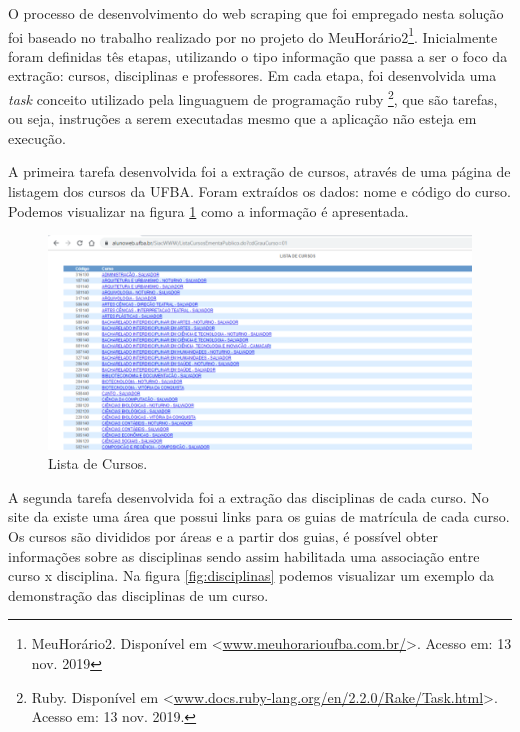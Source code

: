 \documentclass[12pt, a4paper]{report}
\begin{document}
O processo de desenvolvimento do web scraping que foi empregado nesta solução foi baseado no trabalho realizado por \citeauthor{assis2017meuhorario} no projeto do MeuHorário2\footnote{MeuHorário2. Disponível em <\url{www.meuhorarioufba.com.br/}>. Acesso em: 13 nov. 2019}. Inicialmente foram definidas tês etapas, utilizando o tipo informação que passa a ser o foco da extração: cursos, disciplinas e professores.  Em cada etapa, foi desenvolvida uma \textit{task} conceito utilizado pela linguaguem de programação ruby \footnote{Ruby. Disponível em <\url{www.docs.ruby-lang.org/en/2.2.0/Rake/Task.html}>. Acesso em: 13 nov. 2019.}, que são tarefas, ou seja, instruções a serem executadas mesmo que a aplicação não esteja em execução. 

A primeira tarefa desenvolvida foi a extração de cursos, através de uma página de listagem dos cursos da UFBA. Foram extraídos os dados: nome e código do curso. Podemos visualizar na figura \ref{fig:lista_cursos} como a informação é apresentada.

\begin{figure}
\centering
\includegraphics[scale=0.9]{lista_cursos.png}
\caption{Lista de Cursos.}
\label{fig:lista_cursos}
\end{figure}

A segunda tarefa desenvolvida foi a extração das disciplinas de cada curso. No site da  existe uma área que possui links para os guias de matrícula de cada curso. Os cursos são divididos por áreas e a partir dos guias, é possível obter informações sobre as disciplinas sendo assim habilitada uma associação entre curso x disciplina. Na figura \ref{fig:disciplinas} podemos visualizar um exemplo da demonstração das disciplinas de um curso.
\end{document}
